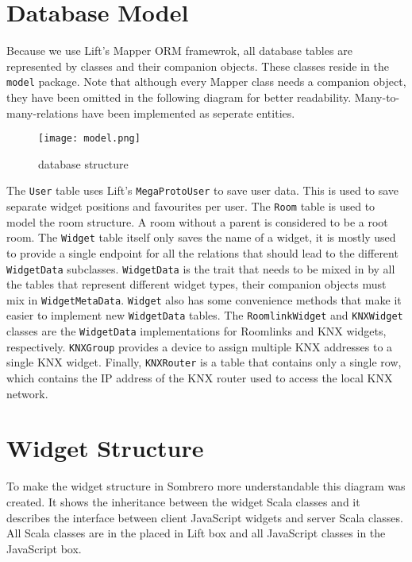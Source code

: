 \section{Database Model}

Because we use Lift's Mapper ORM framewrok, all database tables are represented by classes and their companion objects. These classes reside in the \lstinline!model! package. Note that although every Mapper class needs a companion object, they have been omitted in the following diagram for better readability. Many-to-many-relations have been implemented as seperate entities.

  \begin{figure}[h]
  \centering
  \texttt{[image: model.png]}
  \caption{database structure}
  \label{fig:model}
  \end{figure}

The \lstinline!User! table uses Lift's \lstinline!MegaProtoUser! to save user data. This is used to save separate widget positions and favourites per user. The \lstinline!Room! table is used to model the room structure. A room without a parent is considered to be a root room. The \lstinline!Widget! table itself only saves the name of a widget, it is mostly used to provide a single endpoint for all the relations that should lead to the different \lstinline!WidgetData! subclasses. \lstinline!WidgetData! is the trait that needs to be mixed in by all the tables that represent different widget types, their companion objects must mix in \lstinline!WidgetMetaData!. \lstinline!Widget! also has some convenience methods that make it easier to implement new \lstinline!WidgetData! tables. The \lstinline!RoomlinkWidget! and \lstinline!KNXWidget! classes are the \lstinline!WidgetData! implementations for Roomlinks and KNX widgets, respectively. \lstinline!KNXGroup! provides a device to assign multiple KNX addresses to a single KNX widget. Finally, \lstinline!KNXRouter! is a table that contains only a single row, which contains the IP address of the KNX router used to access the local KNX network.

\section{Widget Structure}
To make the widget structure in Sombrero more understandable this diagram was created. It shows the inheritance between the widget Scala classes and it describes the interface between client JavaScript widgets and server Scala classes. All Scala classes are in the placed in Lift box and all JavaScript classes in the JavaScript box.

